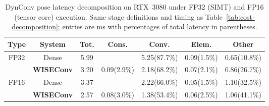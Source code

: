 \begin{table}[htb]
  \centering
  \caption{DynConv pose latency decomposition on RTX~3080 under FP32 (SIMT)
  and FP16 (tensor core) execution. Same stage definitions and timing as
  Table~\ref{tab:cost-decomposition}; entries are ms with percentages of
  total latency in parentheses.}
  \label{tab:dynconv-dtype-decomposition}
  \footnotesize
  \setlength{\tabcolsep}{2.4pt}
  \renewcommand{\arraystretch}{1.15}
  \begin{tabular}{@{}c c c c c c c@{}}
    \hline
    \textbf{Type} & \textbf{System} & \textbf{Tot.} & \textbf{Cons.} &
    \textbf{Conv.} & \textbf{Elem.} & \textbf{Other} \\
    \hline
    \multirow{2}{*}{FP32}
      & Dense & 5.99 & \textemdash{} & 5.25(87.7\%) & 0.09(1.5\%) & 0.65(10.8\%) \\
      & \textbf{WISEConv} & 3.20 & 0.09(2.9\%) & 2.18(68.2\%) & 0.07(2.1\%) & 0.86(26.7\%) \\
    \hline
    \multirow{2}{*}{FP16}
      & Dense & 3.37 & \textemdash{} & 2.22(66.0\%) & 0.05(1.5\%) & 1.10(32.5\%) \\
      & \textbf{WISEConv} & 2.57 & 0.08(3.0\%) & 1.38(53.4\%) & 0.06(2.5\%) & 1.06(41.1\%) \\
    \hline
  \end{tabular}
\end{table}
